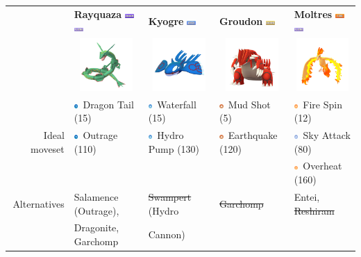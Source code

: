 \documentclass[8pt,aspectratio=169,compress]{beamer}
\newcommand{\firefull}{\includegraphics[height=0.15cm]{../../images/type/full/Fire.png}}
\newcommand{\flyingfull}{\includegraphics[height=0.15cm]{../../images/type/full/Flying.png}}
\newcommand{\dragonfull}{\includegraphics[height=0.15cm]{../../images/type/full/Dragon.png}}
\newcommand{\groundfull}{\includegraphics[height=0.15cm]{../../images/type/full/Ground.png}}
\newcommand{\waterfull}{\includegraphics[height=0.15cm]{../../images/type/full/Water.png}}
\newcommand{\dragonsimp}{\includegraphics[height=0.15cm]{../../images/type/simplified/dragon.png}}
\newcommand{\groundsimp}{\includegraphics[height=0.15cm]{../../images/type/simplified/ground.png}}
\newcommand{\watersimp}{\includegraphics[height=0.15cm]{../../images/type/simplified/water.png}}
\newcommand{\firesimp}{\includegraphics[height=0.15cm]{../../images/type/simplified/fire.png}}
\newcommand{\flyingsimp}{\includegraphics[height=0.15cm]{../../images/type/simplified/flying.png}}
\begin{document}
\begin{frame}
\begin{tiny}
\begin{block}{}
\begin{center}
\bigskip

\begin{tabular}{rp{2.5cm}p{2.5cm}p{2.5cm}p{2.5cm}} 
    & \textbf{Rayquaza} \hfill \dragonfull~\flyingfull & \textbf{Kyogre} \hfill  \waterfull & \textbf{Groudon} \hfill \groundfull &\textbf{Moltres} \hfill \firefull~\flyingfull   \\ 
    &  \multicolumn{1}{c}{\includegraphics[width=2cm]{../../images/pokemon/Rayquaza}} &  \multicolumn{1}{c}{\includegraphics[width=2cm]{../../images/pokemon/Kyogre} } &  \multicolumn{1}{c}{\includegraphics[width=2cm]{../../images/pokemon/Groudon} } &  \multicolumn{1}{c}{\includegraphics[width=2cm]{../../images/pokemon/Moltres} } \\ \hline
\multirow{3}{*}{Ideal moveset}   & \dragonsimp~Dragon Tail (15) & \watersimp~Waterfall (15) & \groundsimp~Mud Shot (5) & \firesimp~Fire Spin (12) \\
    &\dragonsimp~Outrage (110) & \watersimp~Hydro Pump (130) &  \groundsimp~Earthquake (120) & \flyingsimp~Sky Attack (80) \\
    & & & & \firesimp~Overheat (160) \\  \hline  
Alternatives & Salamence (Outrage),  &  \sout{Swampert} (Hydro & \sout{Garchomp} & Entei, \sout{Reshiram}  \\
 & Dragonite, Garchomp & Cannon) & & 
\end{tabular}

\end{center}
\end{block}
\end{tiny}
\end{frame}
\end{document}
